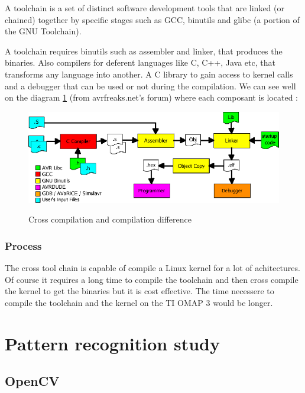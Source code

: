 	\par A toolchain is a set of distinct software development tools that are linked (or chained) together by specific stages such as GCC, binutils and glibc (a portion of the GNU Toolchain)\cite{Toolchain}.
	\par A toolchain requires binutils such as assembler and linker, that produces the binaries. Also compilers for deferent languages like C, C++, Java etc, that transforms any language into another. A C library to gain access to kernel calls and a debugger that can be used or not during the compilation. We can see well on the diagram \ref{compchain} (from avrfreaks.net's forum)  where each composant is located :
	\begin{figure}[ht]
		\begin{center}
			\includegraphics[scale=0.5]{images_not_compressed/compchain.png}
			\label{compchain}
			\caption{Cross compilation and compilation difference}
		\end{center}
	\end{figure}
	
	
	\subsubsection{Process}
	\par The cross tool chain is capable of compile a Linux kernel for a lot of achitectures. Of course it requires a long time to compile the toolchain and then cross compile the kernel to get the binaries but it is cost effective. The time necessere to compile the toolchain and the kernel on the TI OMAP 3 would be longer.

		
	\section{Pattern recognition study}
	\subsection{OpenCV}
	
